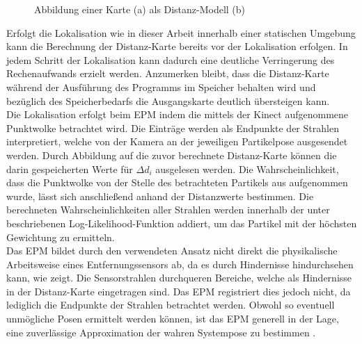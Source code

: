\begin{figure}[!ht]
	\begin{center}
	
	\hspace{5mm}
	\caption{Abbildung einer Karte (a) als Distanz-Modell (b)}
	\label{fig.dist_map}
	\end{center}
\end{figure}

Erfolgt die Lokalisation wie in dieser Arbeit innerhalb einer statischen Umgebung kann die Berechnung der Distanz-Karte bereits vor der Lokalisation erfolgen. In jedem Schritt der Lokalisation kann dadurch eine deutliche Verringerung des Rechenaufwands erzielt werden. Anzumerken bleibt, dass die Distanz-Karte während der Ausführung des Programms im Speicher behalten wird und bezüglich des Speicherbedarfs die Ausgangskarte deutlich übersteigen kann.\\

Die Lokalisation erfolgt beim EPM indem die mittels der Kinect aufgenommene Punktwolke betrachtet wird. Die Einträge werden als Endpunkte der Strahlen interpretiert, welche von der Kamera an der jeweiligen Partikelpose ausgesendet werden. Durch Abbildung auf die zuvor berechnete Distanz-Karte können die darin gespeicherten Werte für ${\Delta d}_i$ ausgelesen werden. Die Wahrscheinlichkeit, dass die Punktwolke von der Stelle des betrachteten Partikels aus aufgenommen wurde, lässt sich anschließend anhand der Distanzwerte bestimmen. Die berechneten Wahrscheinlichkeiten aller Strahlen werden innerhalb der unter  beschriebenen Log-Likelihood-Funktion addiert, um das Partikel mit der höchsten Gewichtung zu ermitteln.\\

Das EPM bildet durch den verwendeten Ansatz nicht direkt die physikalische Arbeitsweise eines Entfernungssensors ab, da es durch Hindernisse \glqq hindurchsehen\grqq{} kann, wie  zeigt. Die Sensorstrahlen durchqueren Bereiche, welche als Hindernisse in der Distanz-Karte eingetragen sind. Das EPM registriert dies jedoch nicht, da lediglich die Endpunkte der Strahlen betrachtet werden. Obwohl so eventuell unmögliche Posen ermittelt werden können, ist das EPM generell in der Lage, eine zuverlässige Approximation der wahren Systempose zu bestimmen \cite{Konolige1999}.


